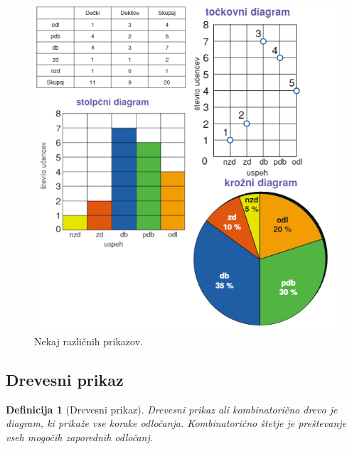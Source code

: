 \documentclass{article}
\newtheorem{definicija}{Definicija}[subsection]
\begin{document}
\begin{figure}[h]
    \includegraphics[width=0.8\linewidth]{prikazi.png}
    \centering
    \caption{Nekaj različnih prikazov.}
\end{figure}

\subsection{Drevesni prikaz}

\begin{definicija}[Drevesni prikaz]
    Drevesni prikaz ali kombinatorično drevo je diagram, ki prikaže vse korake odločanja. Kombinatorično štetje je preštevanje vseh mogočih zaporednih odločanj.
\end{definicija}
\end{document}
